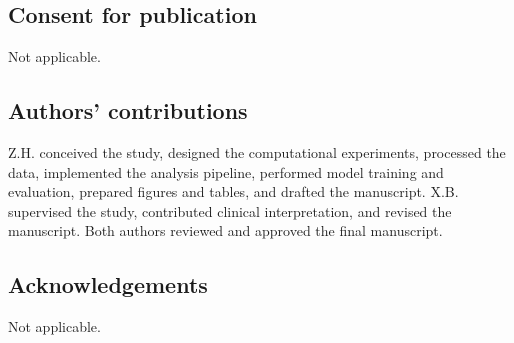 \subsection*{Consent for publication}

Not applicable.

\subsection*{Authors' contributions}

Z.H. conceived the study, designed the computational experiments, processed the data, implemented the analysis pipeline, performed model training and evaluation, prepared figures and tables, and drafted the manuscript. X.B. supervised the study, contributed clinical interpretation, and revised the manuscript. Both authors reviewed and approved the final manuscript.

\subsection*{Acknowledgements}

Not applicable.
